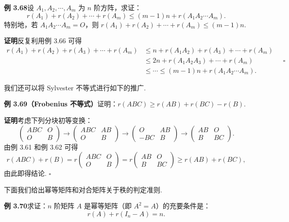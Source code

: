 \documentclass[UTF8, 12pt, fontset=fandol, oneside]{ctexart}
\begin{document}
\noindent\textbf{例 3.68}\quad 设 $A_1,A_2,\cdots,A_m$ 为 $n$ 阶方阵，求证：
\[
r(A_1)+r(A_2)+\cdots+r(A_m)\le (m-1)n+r(A_1A_2\cdots A_m).
\]
特别地，若 $A_1A_2\cdots A_m=O$，则 $r(A_1)+r(A_2)+\cdots+r(A_m)\le (m-1)n$.

\noindent\textbf{证明}\quad 反复利用例 3.66 可得
\[
\begin{aligned}
r(A_1)+r(A_2)+r(A_3)+\cdots+r(A_m)
&\le n+r(A_1A_2)+r(A_3)+\cdots+r(A_m)\\
&\le 2n+r(A_1A_2A_3)+\cdots+r(A_m)\\
&\le\cdots\le (m-1)n+r(A_1A_2\cdots A_m).
\end{aligned}
\quad \square
\]

我们还可以将 Sylvester 不等式进行如下的推广.

\noindent\textbf{例 3.69（Frobenius 不等式）}\quad 证明：$r(ABC)\ge r(AB)+r(BC)-r(B)$.

\noindent\textbf{证明}\quad 考虑下列分块初等变换：
\[
\begin{pmatrix}ABC&O\\O&B\end{pmatrix}
\to
\begin{pmatrix}ABC&AB\\O&B\end{pmatrix}
\to
\begin{pmatrix}O&AB\\-BC&B\end{pmatrix}
\to
\begin{pmatrix}AB&O\\B&BC\end{pmatrix}.
\]
由例 3.61 和例 3.62 可得
\[
r(ABC)+r(B)=r\begin{pmatrix}ABC&O\\O&B\end{pmatrix}
=r\begin{pmatrix}AB&O\\B&BC\end{pmatrix}\ge r(AB)+r(BC),
\]
由此即得结论. $\square$

下面我们给出幂等矩阵和对合矩阵关于秩的判定准则.

\noindent\textbf{例 3.70}\quad 求证：$n$ 阶矩阵 $A$ 是幂等矩阵（即 $A^2=A$）的充要条件是：
\[
r(A)+r(I_n-A)=n.
\]
\end{document}
